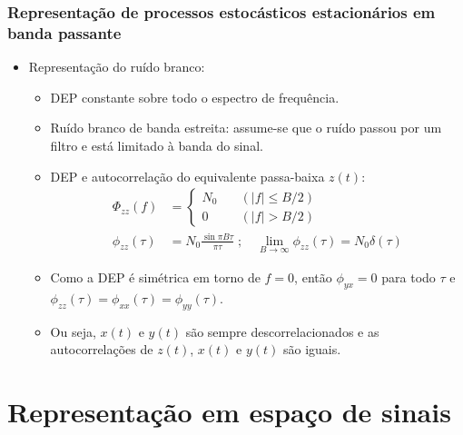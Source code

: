 \begin{frame}
	\frametitle{Representação de processos estocásticos estacionários em banda passante}

	\begin{itemize}
		\item Representação do ruído branco:
		\begin{itemize}
			\item DEP constante sobre todo o espectro de frequência.
			\item Ruído branco de banda estreita: assume-se que o ruído passou por um filtro e está limitado à banda do sinal.
			\item DEP e autocorrelação do equivalente passa-baixa $z(t)$:
			\begin{align*}
				\Phi_{zz}(f) &= \begin{cases}
							N_0 &\quad (|f| \leq B/2) \\
							0 &\quad (|f| > B/2)
				               \end{cases} \\
				\phi_{zz}(\tau) &= N_0 \frac{\sin \pi B \tau}{\pi\tau} \; ; \quad \lim_{B \to \infty} \phi_{zz}(\tau) = N_0\delta(\tau)
			\end{align*}
			\item Como a DEP é simétrica em torno de $f=0$, então $\phi_{yx}=0$ para todo $\tau$ e $\phi_{zz}(\tau)=\phi_{xx}(\tau)=\phi_{yy}(\tau)$.
			\item Ou seja, $x(t)$ e $y(t)$ são sempre descorrelacionados e as autocorrelações de $z(t)$,  $x(t)$ e $y(t)$ são iguais.
		\end{itemize}

	\end{itemize}

\end{frame}



\section{Representação em espaço de sinais}

